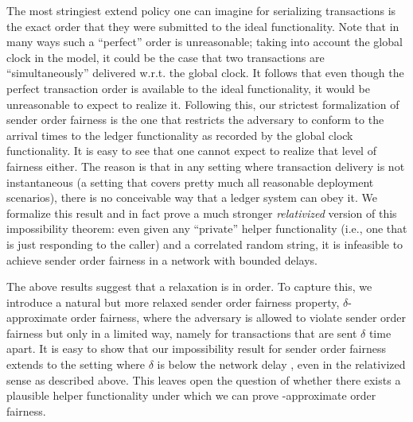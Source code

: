 The most stringiest extend policy one can imagine for serializing transactions is the exact order that they were submitted to the ideal functionality.
%
Note that in many ways such a ``perfect'' order is unreasonable; taking into account the global clock in the model, it could be the case that two transactions are ``simultaneously'' delivered w.r.t. the global clock.
%
It follows that even though the perfect transaction order is available to the ideal functionality, it would be unreasonable to expect to realize it.
%
Following this, our strictest formalization of sender order fairness is the one that restricts the adversary to conform to the arrival times to the ledger functionality as recorded by the global clock functionality.
%
It is easy to see that one cannot expect to realize that level of fairness either.
%
The reason is that in any setting where transaction delivery is not instantaneous (a setting that covers pretty much all reasonable deployment scenarios), there is no conceivable way that a ledger system can obey it.
%
We formalize this result and in fact prove a much stronger \emph{relativized} version of this impossibility theorem: even given any ``private'' helper functionality (i.e., one that is just responding to the caller) and a correlated random string, it is infeasible to achieve sender order fairness in a network with bounded delays.

The above results suggest that a relaxation is in order.
%
To capture this, we introduce a natural but more relaxed sender order fairness property, $\delta$-approximate order fairness, where the adversary is allowed to violate sender order fairness but only in a limited way, namely for transactions that are sent $\delta$ time apart.
%
It is easy to show that our impossibility result for sender order fairness extends to the setting where $\delta$ is below the network delay \delay, even in the relativized sense as described above.
%
This leaves open the question of whether there exists a plausible helper functionality under which we can prove \delay-approximate order fairness.

